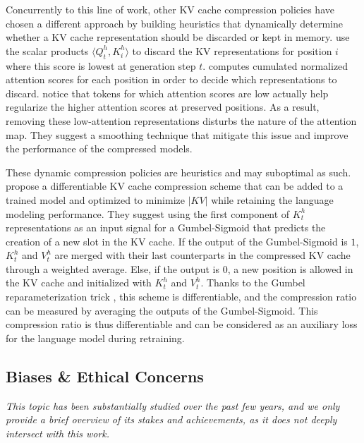 Concurrently to this line of work, other KV cache compression policies have chosen a different approach by building heuristics that dynamically determine whether a KV cache representation should be discarded or kept in memory. \citet{oren2024transformersmultistaternns} use the scalar products $\langle Q^h_t, K^h_i \rangle$ to discard the KV representations for position $i$ where this score is lowest at generation step $t$. \citet{h2o} computes cumulated normalized attention scores for each position in order to decide which representations to discard. \citet{keyformer} notice that tokens for which attention scores are low actually help regularize the higher attention scores at preserved positions. As a result, removing these low-attention representations disturbs the nature of the attention map. They suggest a smoothing technique that mitigate this issue and improve the performance of the compressed models.

These dynamic compression policies \citep{shi2024costdownreviewmethods} are heuristics and may suboptimal as such. \citet{nawrot2024dynamic} propose a differentiable KV cache compression scheme that can be added to a trained model and optimized to minimize $|KV|$ while retaining the language modeling performance. They suggest using the first component of $K^h_t$ representations as an input signal for a Gumbel-Sigmoid that predicts the creation of a new slot in the KV cache. If the output of the Gumbel-Sigmoid is $1$, $K^h_t$ and $V^h_t$ are merged with their last counterparts in the compressed KV cache through a weighted average. Else, if the output is $0$, a new position is allowed in the KV cache and initialized with $K^h_t$ and $V^h_t$. Thanks to the Gumbel reparameterization trick \citep{gumbel-orig}, this scheme is differentiable, and the compression ratio can be measured by averaging the outputs of the Gumbel-Sigmoid. This compression ratio is thus differentiable and can be considered as an auxiliary loss for the language model during retraining.




\subsection{Biases \& Ethical Concerns}

\textit{This topic has been substantially studied over the past few years, and we only provide a brief overview of its stakes and achievements, as it does not deeply intersect with this work.}


